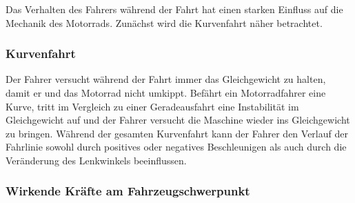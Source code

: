 Das Verhalten des Fahrers während der Fahrt hat einen starken Einfluss auf die Mechanik des Motorrads. Zunächst wird die Kurvenfahrt näher betrachtet.

\subsubsection{Kurvenfahrt} 

Der Fahrer versucht während der Fahrt immer das Gleichgewicht zu halten, damit er und das Motorrad nicht umkippt.
Befährt ein Motorradfahrer eine Kurve, tritt im Vergleich zu einer Geradeausfahrt eine Instabilität im Gleichgewicht auf und der Fahrer versucht die Maschine wieder ins Gleichgewicht zu bringen. Während der gesamten Kurvenfahrt kann der Fahrer den Verlauf der Fahrlinie sowohl durch positives oder negatives Beschleunigen als auch durch die Veränderung des Lenkwinkels beeinflussen. \citep{Haedrich2012} 


\subsubsection{Wirkende Kräfte am Fahrzeugschwerpunkt}

